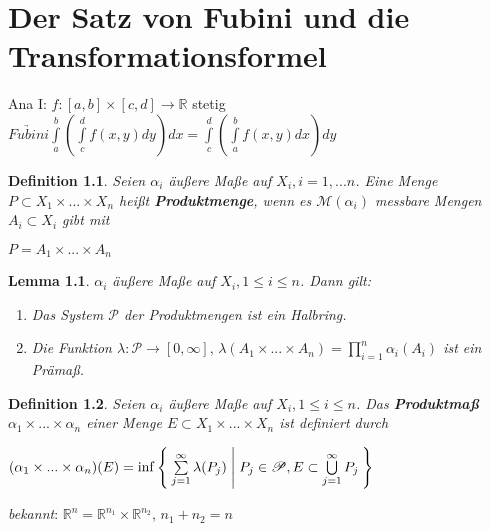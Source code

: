 \documentclass[11pt]{memoir}
\theoremstyle{changebreak}
\newtheorem{Definition}{Definition}[chapter]
\newtheorem{Lemma}{Lemma}[chapter]
\begin{document}




\newpage
\chapter{Der Satz von Fubini und die Transformationsformel}
Ana I: $f: [a, b] \times [c, d] \rightarrow \mathbb R$ stetig \\
$\underrightarrow{Fubini} \int\limits_a^b \left( \int\limits_c^d f(x, y) dy\right) dx = \int\limits_c^d \left( \int\limits_a^b f(x, y) dx \right) dy$

\begin{Definition}
Seien $\alpha_i$ äußere Maße auf $X_i, i = 1, ... n$. Eine Menge $P \subset X_1 \times ... \times X_n$ heißt \textbf{Produktmenge}, wenn es $\mathscr M(\alpha_i)$ messbare Mengen $A_i \subset X_i$ gibt mit
\begin{center}
	$P = A_1 \times ... \times A_n$
\end{center}
\end{Definition}

\begin{Lemma}
$\alpha_i$ äußere Maße auf $X_i, 1 \leq i \leq n$. Dann gilt:
\begin{enumerate}
	\item Das System $\mathscr P$ der Produktmengen ist ein Halbring.
	\item Die Funktion $\lambda: \mathscr P \rightarrow [0, \infty], \, \lambda(A_1 \times ... \times A_n) = \prod\limits_{i=1}^n \alpha_i(A_i)$ ist ein Prämaß.
\end{enumerate}
\end{Lemma}

\begin{Definition}
Seien $\alpha_i$ äußere Maße auf $X_i, 1 \leq i \leq n$. Das \textbf{Produktmaß} $\alpha_1 \times ... \times \alpha_n$ einer Menge $E \subset X_1 \times ... \times X_n$ ist definiert durch
\begin{center}
	$(\alpha_1 \times ... \times \alpha_n)(E) = \inf\Set{ \sum\limits_{j=1}^\infty \lambda(P_j) | P_j \in \mathscr P, E \subset \bigcup\limits_{j=1}^\infty P_j }$

\end{center}
\end{Definition}

\emph{bekannt}:
$\mathbb R^n = \mathbb R^{n_1} \times \mathbb R^{n_2}$, $n_1 + n_2 = n$
\end{document}
